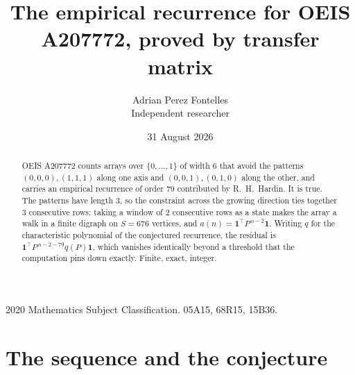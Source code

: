 \documentclass[11pt,a4paper]{article}
\title{The empirical recurrence for OEIS A207772, proved by transfer matrix}
\author{Adrian Perez Fontelles\\ \small Independent researcher}
\date{31 August 2026}
\theoremstyle{plain}
\theoremstyle{definition}
\begin{document}
\maketitle

\begin{abstract}
OEIS A207772 counts arrays over $\{0,\dots,1\}$ of width $6$ that avoid the patterns
$(0,0,0), (1,1,1)$ along one axis and $(0,0,1), (0,1,0)$ along the other, and carries an empirical recurrence of
order $79$ contributed by R.~H.~Hardin. It is true. The patterns have length $3$, so
the constraint across the growing direction ties together $3$ consecutive rows: taking a
window of $2$ consecutive rows as a state makes the array a walk in a finite digraph
on $S=676$ vertices, and $a(n)=\mathbf{1}^{\!\top}P^{\,n-2}\mathbf{1}$. Writing $q$
for the characteristic polynomial of the conjectured recurrence, the residual is
$\mathbf{1}^{\!\top}P^{\,n-2-79}q(P)\mathbf{1}$, which vanishes identically
beyond a threshold that the computation pins down exactly. Finite, exact, integer.
\end{abstract}

\noindent\small 2020 Mathematics Subject Classification. 05A15, 68R15, 15B36.\normalsize

\section{The sequence and the conjecture}
\end{document}
